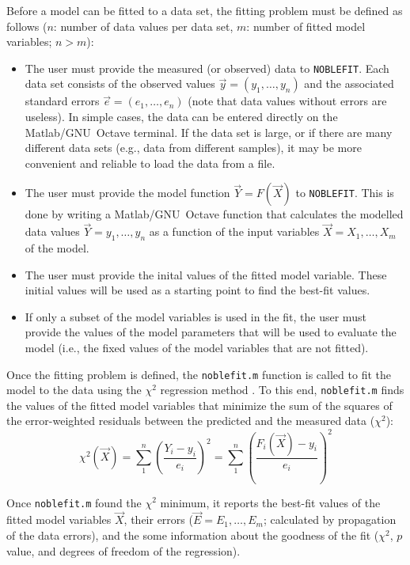\documentclass[12pt]{article}
\newcommand{\noblefit}{{\tt NOBLEFIT}}
\begin{document}
Before a model can be fitted to a data set, the fitting problem must be defined as follows ($n$: number of data values per data set, $m$: number of fitted model variables; $ n > m$):
\begin{itemize}
\item The user must provide the measured (or observed) data to \noblefit. Each data set consists of the observed values $\vec{y} = (y_1, \ldots, y_n)$ and the associated standard errors $\vec{e} = (e_1, \ldots, e_n)$ (note that data values without errors are useless). In simple cases, the data can be entered directly on the Matlab/\mbox{GNU Octave} terminal. If the data set is large, or if there are many different data sets (e.g., data from different samples), it may be more convenient and reliable to load the data from a file.
\item The user must provide the model function $\vec{Y} = F(\vec{X})$ to \noblefit. This is done by writing a Matlab/\mbox{GNU Octave} function that calculates the modelled data values $\vec{Y} = y_1, \ldots, y_n$ as a function of the input variables $\vec{X} = X_1, \ldots, X_m$ of the model.
\item The user must provide the inital values of the fitted model variable. These initial values will be used as a starting point to find the best-fit values.
\item If only a subset of the model variables is used in the fit, the user must provide the values of the model parameters that will be used to evaluate the model (i.e., the fixed values of the model variables that are not fitted).
\end{itemize}

Once the fitting problem is defined, the {\tt noblefit.m} function is called to fit the model to the data using the $\chi^2$ regression method \citep{Press:1986}. To this end, {\tt noblefit.m} finds the values of the fitted model variables that minimize the sum of the squares of the error-weighted residuals between the predicted and the measured data ($\chi^2$):
\begin{displaymath}
\chi^2(\vec{X}) = \sum_1^n \left(\frac{Y_i - y_i}{e_i}\right)^2 = \sum_1^n \left(\frac{F_i(\vec{X}) - y_i}{e_i}\right)^2
\end{displaymath}

Once {\tt noblefit.m} found the $\chi^2$ minimum, it reports the best-fit values of the fitted model variables $\vec{X}$, their errors ($\vec{E} = E_1,\ldots,E_m$; calculated by propagation of the data errors), and the some information about the goodness of the fit ($\chi^2$, $p$ value, and degrees of freedom of the regression).\par
\end{document}
